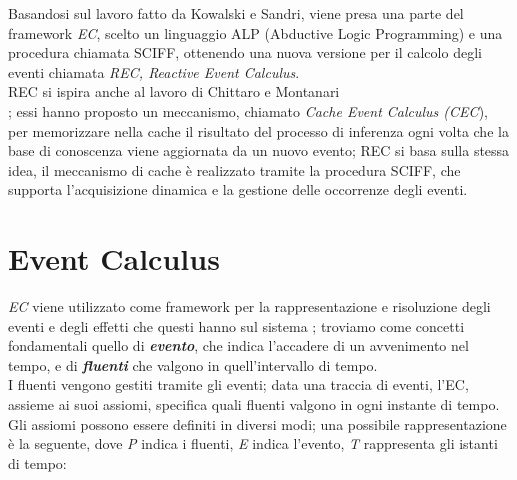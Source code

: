 \documentclass[a4paper,12pt]{report}
\begin{document}
Basandosi sul lavoro fatto da Kowalski e Sandri, viene presa una parte del framework \textit{EC}, scelto un linguaggio ALP (Abductive Logic Programming) \cite{rif8} e una procedura chiamata SCIFF, ottenendo una nuova versione per il calcolo degli eventi chiamata \textit{REC, Reactive Event Calculus}.\\
REC si ispira anche al lavoro di Chittaro e Montanari \\\cite{rif9}; essi hanno proposto un meccanismo, chiamato \textit{Cache Event Calculus (CEC}), per memorizzare nella cache il risultato del processo di inferenza ogni volta che la base di conoscenza viene aggiornata da un nuovo evento; REC si basa sulla stessa idea, il meccanismo di cache è realizzato tramite la procedura SCIFF, che supporta l'acquisizione dinamica e la gestione delle occorrenze degli eventi.
\newpage
\section{Event Calculus}
\textit{EC} viene utilizzato come framework per la rappresentazione e risoluzione degli eventi e degli effetti che questi hanno sul sistema \cite{rif7}; troviamo come concetti fondamentali quello di \textbf{\textit{evento}}, che indica l'accadere di un avvenimento nel tempo, e di \textbf{\textit{fluenti}} che valgono in quell'intervallo di tempo.\\
I fluenti vengono gestiti tramite gli eventi; data una traccia di eventi, l'EC, assieme ai suoi assiomi, specifica quali fluenti valgono in ogni instante di tempo.\\
Gli assiomi possono essere definiti in diversi modi; una possibile rappresentazione è la seguente, dove \textit{P} indica i fluenti, \textit{E} indica l'evento, \textit{T} rappresenta gli istanti di tempo:\\
\\
    \\ \\
    \scalebox{0.9}{(2) $clipped(T_1,P,T_3) \leftarrow terminates(E,P,T_2)\wedge T_1 < T_2\wedge T_2 < T_3$.}\\ \\
    \scalebox{0.9}{(3) $initiates(E,P,T) \leftarrow happens\_at(E,T)$}\\\scalebox{0.9}{$\ \ \ \ \ \ \ \ \ \ \ \ \ \ \ \ \ \ \ \ \ \ \ \ \ \ \ \ \ \ \ \ \ \ \ \ \ \ \ \wedge [\neg{}]holds\_at(P_1,T) \wedge \dots \wedge [\neg{}]holds\_at(P_N,T)$.}\\ \\
\end{document}
